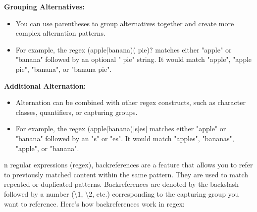 \documentclass{report}
\begin{document}
    \bigbreak \noindent 
    \textbf{Grouping Alternatives:}
    \begin{itemize}
        \item You can use parentheses to group alternatives together and create more complex alternation patterns.
        \item For example, the regex (apple|banana)( pie)? matches either "apple" or "banana" followed by an optional " pie" string. It would match "apple", "apple pie", "banana", or "banana pie".
    \end{itemize}

    \bigbreak \noindent 
    \textbf{Additional Alternation:}
    \begin{itemize}
        \item Alternation can be combined with other regex constructs, such as character classes, quantifiers, or capturing groups.
        \item For example, the regex (apple|banana)[s|es] matches either "apple" or "banana" followed by an "s" or "es". It would match "apples", "bananas", "apple", or "banana".
    \end{itemize}
    \bigbreak \noindent 


    \pagebreak
    \bigbreak
    \noindent

    n regular expressions (regex), backreferences are a feature that allows you to refer to previously matched content within the same pattern. They are used to match repeated or duplicated patterns. Backreferences are denoted by the backslash followed by a number (\textbackslash 1, \textbackslash 2, etc.) corresponding to the capturing group you want to reference.
    \bigbreak \noindent 
    Here's how backreferences work in regex:
\end{document}
